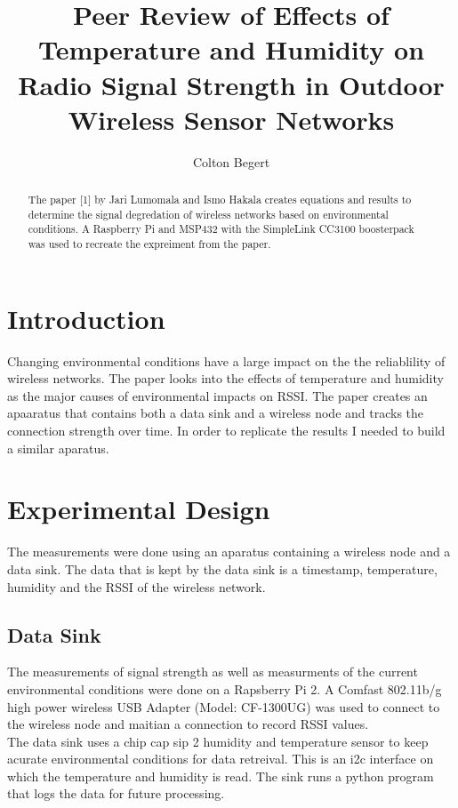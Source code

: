 \documentclass{article}
\begin{document}
\title{Peer Review of Effects of Temperature and Humidity on Radio Signal Strength in Outdoor Wireless Sensor Networks}
\author{Colton Begert}

\maketitle

\begin{abstract}
The paper [1] by Jari Lumomala and Ismo Hakala creates equations and results to determine the signal degredation of wireless networks based on environmental conditions.
A Raspberry Pi and MSP432 with the SimpleLink CC3100 boosterpack was used to recreate the expreiment from the paper.

\end{abstract}

\section{Introduction}
Changing environmental conditions have a large impact on the the reliablility of wireless networks. The paper looks into the effects of temperature and humidity as the major causes of environmental impacts on RSSI.
The paper creates an apaaratus that contains both a data sink and a wireless node and tracks the connection strength over time. In order to replicate the results I needed to build a similar aparatus.\\




\section{Experimental Design}
The measurements were done using an aparatus containing a wireless node and a data sink. The data that is kept by the data sink is a timestamp, temperature, humidity and the RSSI of the wireless network.
\subsection{Data Sink}
The measurements of signal strength as well as measurments of the current environmental conditions were done on a Rapsberry Pi 2.
A Comfast 802.11b/g high power wireless USB Adapter (Model: CF-1300UG) was used to connect to the wireless node and maitian a connection to record RSSI values.\\

The data sink uses a chip cap sip 2 humidity and temperature sensor to keep acurate environmental conditions for data retreival.
This is an i2c interface on which the temperature and humidity is read. The sink runs a python program that logs the data for future processing.\\
\end{document}
